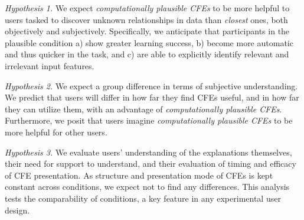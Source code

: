 \textit{Hypothesis 1.} We expect \textit{computationally plausible \glspl{CFE}} to be more helpful to users tasked to discover unknown relationships in data than \textit{closest} ones, both objectively and subjectively. 
Specifically, we anticipate that participants in the plausible condition a) show greater learning success, b) become more automatic and thus quicker in the task, and c) are able to explicitly identify relevant and irrelevant input features.

\textit{Hypothesis 2.} We expect a group difference in terms of subjective understanding.
We predict that users will differ in how far they find \glspl{CFE} useful, and in how far they can utilize them, with an advantage of \textit{computationally plausible \glspl{CFE}}. %
Furthermore, we posit that users imagine \textit{computationally plausible \glspl{CFE}} to be more helpful for other users. %

\textit{Hypothesis 3.} We evaluate users' understanding of the explanations themselves, their need for support to understand, and their evaluation of timing and efficacy of \gls{CFE} presentation. As structure and presentation mode of \glspl{CFE} is kept constant across conditions, we expect not to find any differences.
This analysis tests the comparability of conditions, a key feature in any experimental user design.

